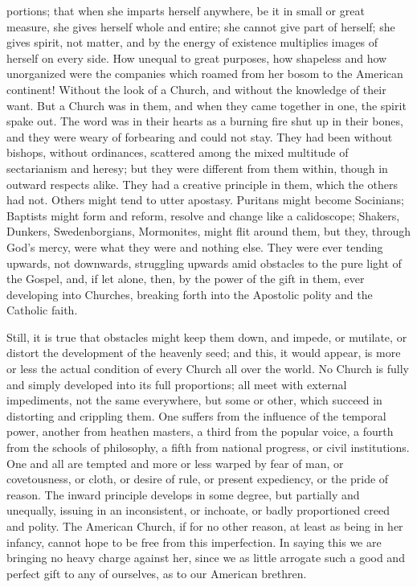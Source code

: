 portions; that when she imparts herself anywhere, be it in small or
great measure, she gives herself whole and entire; she cannot give
part of herself; she gives spirit, not matter, and by the energy of
existence multiplies images of herself on every side. How unequal to
great purposes, how shapeless and how unorganized were the companies
which roamed from her bosom to the American continent! Without the
look of a Church, and without the knowledge of their want. But a
Church was in them, and when they came together in one, the spirit
spake out. The word was in their hearts as a burning fire shut up in
their bones, and they were weary of forbearing and could not stay.
They had been without bishops, without ordinances, scattered among the
mixed multitude of sectarianism and heresy; but they were different from them within, though in outward respects alike. They had
a creative principle in them, which the others had not. Others might
tend to utter apostasy. Puritans might become Socinians; Baptists
might form and reform, resolve and change like a calidoscope; Shakers,
Dunkers, Swedenborgians, Mormonites, might flit around them, but they,
through God's mercy, were what they were and nothing else. They were
ever tending upwards, not downwards, struggling upwards amid obstacles
to the pure light of the Gospel, and, if let alone, then, by the power
of the gift in them, ever developing into Churches, breaking forth
into the Apostolic polity and the Catholic faith.

Still, it is true that obstacles might keep them
down, and impede, or mutilate, or distort the development of the
heavenly seed; and this, it would appear, is more or less the actual
condition of every Church all over the world. No Church is fully and
simply developed into its full proportions; all meet with external
impediments, not the same everywhere, but some or other, which succeed
in distorting and crippling them. One suffers from the influence of
the temporal power, another from heathen masters, a third from the
popular voice, a fourth from the schools of philosophy, a fifth from
national progress, or civil institutions. One and all are tempted and
more or less warped by fear of man, or covetousness, or cloth, or
desire of rule, or present expediency, or the pride of reason. The
inward principle develops in some degree, but partially and unequally,
issuing in an inconsistent, or inchoate, or badly proportioned creed
and polity. The American Church, if for no other reason, at least as
being in her infancy, cannot hope to be free from this imperfection.
In saying this we are bringing no heavy charge against her, since we
as little arrogate such a good and perfect gift to any of
ourselves, as to our American brethren.

